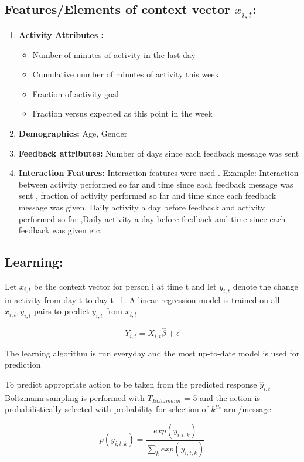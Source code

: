 \documentclass[11pt]{article}
\begin{document}
\subsection{Features/Elements of context vector \textbf{$x_{i,t}$:}}
\begin{enumerate}
\item  \textbf{Activity Attributes :}
\begin{itemize}
\item  Number of minutes of activity in the last day
\item  Cumulative number of minutes of activity this week
\item  Fraction of activity goal
\item  Fraction versus expected as this point in the week
\end{itemize}
\item  \textbf{Demographics:} Age, Gender
\item  \textbf{Feedback attributes:} Number of days since each feedback message was sent
\item  \textbf{Interaction Features:} Interaction features were used . Example: Interaction between activity performed so far and time since each feedback message was sent , fraction of activity performed so far and time since each feedback message was given, Daily activity a day before feedback and activity performed so far ,Daily activity a day before feedback and  time since each feedback was given etc.
\end{enumerate}
\subsection{Learning:}
Let $x_{i,t}$   be the context vector for person i at time t and let $y_{i,t}$ denote the change in activity from day t to day t+1.
A linear regression model is trained on all $x_{i,t},y_{i,t}$ pairs to predict $y_{i,t}$ from $x_{i,t}$

\begin{equation}
  Y_{i,t}=X_{i,t}\hat\beta+\epsilon
\end{equation}

\begin{flushleft}The learning algorithm is run everyday and the most up-to-date model is used for prediction

To predict appropriate action to be taken from the predicted  response $\hat y_{i,t}$ Boltzmann sampling is performed with 
$T_{Boltzmann}$ = 5 and the action is probabilistically selected with probability for selection of $k^{th}$ arm/message
\end{flushleft}
\begin{equation}
    p(y_{i,t,k}) = \frac{exp(y_{i,t,k})}{\sum_{k}exp(y_{i,t,k})}
\end{equation}
\end{document}
